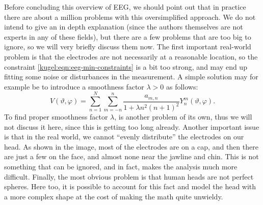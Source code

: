 Before concluding this overview of EEG, we should point out that in practice
there are about a million problems with this oversimplified approach. We do not
intend to give an in depth explanation (since the authors themselves are not
experts in any of these fields), but there are a few problems that are too big
to ignore, so we will very briefly discuss them now. The first important
real-world problem is that the electrodes are not necessarily at a reasonable
location, so the constraint \eqref{kugel:eqn:eeg-min-constraints} is a bit too
strong, and may end up fitting some noise or disturbances in the measurement. A
simple solution may for example be to introduce a smoothness factor $\lambda >
0$ as follows:
\begin{equation}
  V(\vartheta, \varphi) = \sum_{n=1}^N \sum_{m=-n}^n 
    \frac{a_{m,n}}{1 + \lambda n^2(n+1)^2} Y^m_n(\vartheta, \varphi).
\end{equation}
To find proper smoothness factor $\lambda$, is another problem of its own, thus
we will not discuss it here, since this is getting too long already. Another
important issue is that in the real world, we cannot ``evenly distribute'' the
electrodes on our head. As shown in the image, most of the electrodes are on a
cap, and then there are just a few on the face, and almost none near the jawline
and chin. This is not something that can be ignored, and in fact, makes the
analysis much more difficult. Finally, the most obvious problem is that human
heads are not perfect spheres. Here too, it is possible to account for this fact
and model the head with a more complex shape at the cost of making the math
quite unwieldy.

